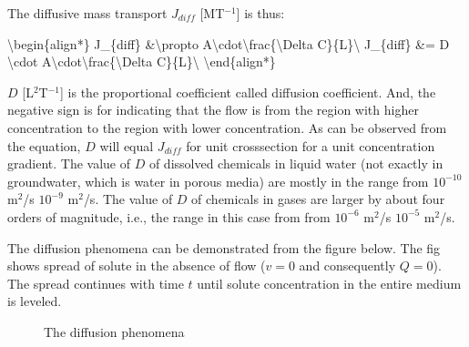 \documentclass[letterpaper,10pt,english]{jupyterBook}
\begin{document}
\sphinxAtStartPar
The diffusive mass transport \(J_{diff}\) {[}MT\(^{-1}\){]} is thus:

\sphinxAtStartPar
\textbackslash{}begin\{align*\}
J\_\{diff\} \&\textbackslash{}propto \sphinxhyphen{} A\textbackslash{}cdot\textbackslash{}frac\{\textbackslash{}Delta C\}\{L\}\textbackslash{}
J\_\{diff\} \&= \sphinxhyphen{} D \textbackslash{}cdot A\textbackslash{}cdot\textbackslash{}frac\{\textbackslash{}Delta C\}\{L\}\textbackslash{}
\textbackslash{}end\{align*\}

\sphinxAtStartPar
\(D\) {[}L\(^2\)T\(^{-1}\){]} is the proportional coefficient called diffusion coefficient. And, the negative sign is for indicating that the flow is from the region with higher concentration to the region with lower concentration. As can be observed from the equation, \(D\) will equal \(J_{diff}\) for unit cross\sphinxhyphen{}section for a unit concentration gradient. The value of \(D\) of dissolved chemicals in liquid water (not exactly in groundwater, which is water in porous media) are mostly in the range from \(10^{-10}\) m\(^2\)/s \sphinxhyphen{}  \(10^{-9}\) m\(^2\)/s. The value of \(D\) of chemicals in gases are larger by about four orders of magnitude, i.e., the range in this case from from \(10^{-6}\) m\(^2\)/s \sphinxhyphen{}  \(10^{-5}\) m\(^2\)/s.

\sphinxAtStartPar
The diffusion phenomena can be demonstrated from the figure below. The fig shows spread of solute in the absence of flow (\(v=0\) and consequently \(Q=0\)). The spread continues with time \(t\) until solute concentration in the entire medium is leveled.

\begin{figure}[htbp]
\centering
\capstart

\noindent{}
\caption{The diffusion phenomena}\label{\detokenize{content/transport/L9/21_conservative_transport:dif}}\end{figure}
\end{document}

